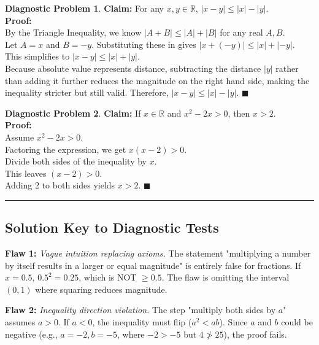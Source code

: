 \documentclass[11pt]{article}
\theoremstyle{definition}
\newtheorem{flawprob}{Diagnostic Problem}
\theoremstyle{remark}
\begin{document}
\begin{itemize}
\begin{flawprob}
\textbf{Claim:} For any $x, y \in \mathbb{R}$, $|x - y| \le |x| - |y|$. \\
\textbf{Proof:} \\
By the Triangle Inequality, we know $|A + B| \le |A| + |B|$ for any real $A, B$. \\
Let $A = x$ and $B = -y$. Substituting these in gives $|x + (-y)| \le |x| + |-y|$. \\
This simplifies to $|x - y| \le |x| + |y|$. \\
Because absolute value represents distance, subtracting the distance $|y|$ rather than adding it further reduces the magnitude on the right hand side, making the inequality stricter but still valid. Therefore, $|x - y| \le |x| - |y|$. $\blacksquare$
\end{flawprob}

\begin{flawprob}
\textbf{Claim:} If $x \in \mathbb{R}$ and $x^2 - 2x > 0$, then $x > 2$. \\
\textbf{Proof:} \\
Assume $x^2 - 2x > 0$. \\
Factoring the expression, we get $x(x - 2) > 0$. \\
Divide both sides of the inequality by $x$. \\
This leaves $(x - 2) > 0$. \\
Adding 2 to both sides yields $x > 2$. $\blacksquare$
\end{flawprob}

\vspace{1cm}
\hrule
\vspace{1cm}

\subsection{Solution Key to Diagnostic Tests}

\textbf{Flaw 1:} \textit{Vague intuition replacing axioms.} The statement "multiplying a number by itself results in a larger or equal magnitude" is entirely false for fractions. If $x = 0.5$, $0.5^2 = 0.25$, which is NOT $\ge 0.5$. The flaw is omitting the interval $(0, 1)$ where squaring reduces magnitude.

\textbf{Flaw 2:} \textit{Inequality direction violation.} The step "multiply both sides by $a$" assumes $a > 0$. If $a < 0$, the inequality must flip ($a^2 < ab$). Since $a$ and $b$ could be negative (e.g., $a = -2, b = -5$, where $-2 > -5$ but $4 \not> 25$), the proof fails. 


\end{itemize}
\end{document}
